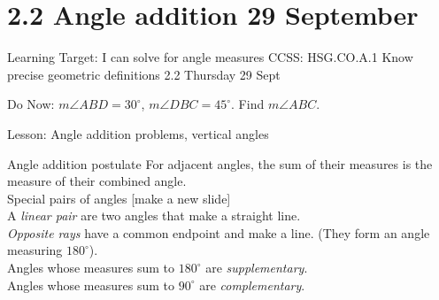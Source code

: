 \section{2.2 Angle addition \hfill 29 September}
\begin{frame}{Learning Target: I can solve for angle measures}
  {CCSS: HSG.CO.A.1 Know precise geometric definitions \hfill \alert{2.2 Thursday 29 Sept}}

  \begin{block}{Do Now: $m\angle ABD=30^\circ$, $m\angle DBC=45^\circ$. Find $m\angle ABC$.}\vspace{0.5cm}
          \begin{center}
            \end{center}
  \end{block}
  Lesson: Angle addition problems, vertical angles
\end{frame}

\begin{frame}{Angle addition postulate}
    For adjacent angles, the sum of their measures is the measure of their combined angle.\\
    Special pairs of angles [make a new slide]\\
    A \emph{linear pair} are two angles that make a straight line. \\
    \emph{Opposite rays} have a common endpoint and make a line. (They form an angle measuring $180^\circ$).\\
    Angles whose measures sum to $180^\circ$ are \emph{supplementary}. \\
    Angles whose measures sum to $90^\circ$ are \emph{complementary}.
    \begin{center}
      \end{center}
\end{frame}

